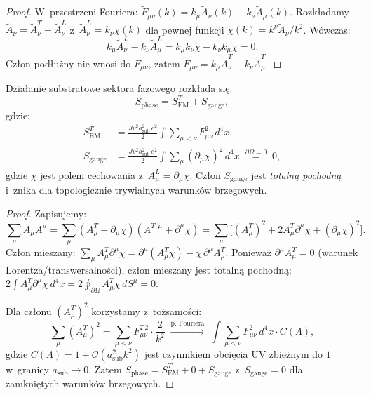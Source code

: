 \begin{proof}
W~przestrzeni Fouriera:
$\tilde{F}_{\mu\nu}(k) = k_\mu\tilde{A}_\nu(k) - k_\nu\tilde{A}_\mu(k)$.
Rozkładamy $\tilde{A}_\nu = \tilde{A}_\nu^T + \tilde{A}_\nu^L$
z~$\tilde{A}_\nu^L = k_\nu\tilde{\chi}(k)$ dla pewnej funkcji
$\tilde{\chi}(k) = k^\nu\tilde{A}_\nu/k^2$. Wówczas:
\begin{equation}
  k_\mu\tilde{A}_\nu^L - k_\nu\tilde{A}_\mu^L
  = k_\mu k_\nu\tilde{\chi} - k_\nu k_\mu\tilde{\chi} = 0.
\end{equation}
Człon podłużny nie wnosi do $F_{\mu\nu}$, zatem
$\tilde{F}_{\mu\nu} = k_\mu\tilde{A}_\nu^T - k_\nu\tilde{A}_\mu^T$.
\end{proof}

\begin{twierdzenie}
\label{thm:supset_exact}
Działanie substratowe sektora fazowego rozkłada się:
\begin{equation}
  S_\mathrm{phase}
  = S_\mathrm{EM}^T + S_\mathrm{gauge},
\end{equation}
gdzie:
\begin{align}
  S_\mathrm{EM}^T
  &= \frac{Jv^2 a_\mathrm{sub}^2\,e^2}{2}
     \int\!\sum_{\mu<\nu}F_{\mu\nu}^2\,d^4x,
  \label{eq:S_EM_T}\\
  S_\mathrm{gauge}
  &= \frac{Jv^2 a_\mathrm{sub}^2\,e^2}{2}
     \int\!\sum_\mu (\partial_\mu\chi)^2\,d^4x
  \;\stackrel{\partial\Omega = 0}{=}\; 0,
  \label{eq:S_gauge}
\end{align}
gdzie $\chi$ jest polem cechowania z~$A_\mu^L = \partial_\mu\chi$.
Człon $S_\mathrm{gauge}$ jest \emph{totalną pochodną} i~znika dla
topologicznie trywialnych warunków brzegowych.
\end{twierdzenie}

\begin{proof}
Zapisujemy:
\begin{equation}
  \sum_\mu A_\mu A^\mu
  = \sum_\mu (A_\mu^T + \partial_\mu\chi)(A^{T,\mu} + \partial^\mu\chi)
  = \sum_\mu \bigl[(A_\mu^T)^2 + 2A_\mu^T\partial^\mu\chi
    + (\partial_\mu\chi)^2\bigr].
\end{equation}
Człon mieszany: $\sum_\mu A_\mu^T\partial^\mu\chi
= \partial^\mu(A_\mu^T\chi) - \chi\,\partial^\mu A_\mu^T$.
Ponieważ $\partial^\mu A_\mu^T = 0$ (warunek Lorentza/transwersalności),
człon mieszany jest totalną pochodną:
$2\int A_\mu^T\partial^\mu\chi\,d^4x = 2\oint_{\partial\Omega}A_\mu^T\chi\,dS^\mu = 0$.

Dla członu $(A_\mu^T)^2$ korzystamy z~tożsamości:
\begin{equation}
  \sum_\mu (A_\mu^T)^2 = \sum_{\mu<\nu}F_{\mu\nu}^{T\,2}\cdot\frac{2}{k^2}
  \;\xrightarrow{\text{p. Fouriera}}\;
  \int\!\sum_{\mu<\nu}F_{\mu\nu}^2\,d^4x \cdot C(\Lambda),
\end{equation}
gdzie $C(\Lambda) = 1 + \mathcal{O}(a_\mathrm{sub}^2 k^2)$ jest czynnikiem
obcięcia UV zbieżnym do $1$ w~granicy $a_\mathrm{sub} \to 0$. Zatem
$S_\mathrm{phase} = S_\mathrm{EM}^T + 0 + S_\mathrm{gauge}$ z~$S_\mathrm{gauge} = 0$
dla zamkniętych warunków brzegowych.
\end{proof}

